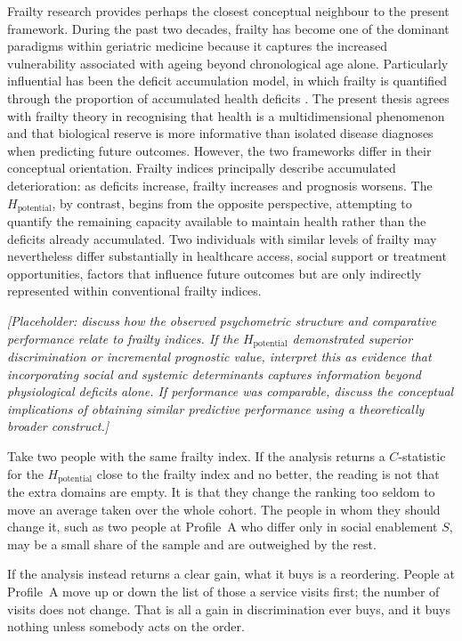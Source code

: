 Frailty research provides perhaps the closest conceptual neighbour to the present framework. During the past two decades, frailty has become one of the dominant paradigms within geriatric medicine because it captures the increased vulnerability associated with ageing beyond chronological age alone. Particularly influential has been the deficit accumulation model, in which frailty is quantified through the proportion of accumulated health deficits \citep{rockwood_mitnitski_2007,searle_2008}. The present thesis agrees with frailty theory in recognising that health is a multidimensional phenomenon and that biological reserve is more informative than isolated disease diagnoses when predicting future outcomes. However, the two frameworks differ in their conceptual orientation. Frailty indices principally describe accumulated deterioration: as deficits increase, frailty increases and prognosis worsens. The $H_{\text{potential}}$, by contrast, begins from the opposite perspective, attempting to quantify the remaining capacity available to maintain health rather than the deficits already accumulated. Two individuals with similar levels of frailty may nevertheless differ substantially in healthcare access, social support or treatment opportunities, factors that influence future outcomes but are only indirectly represented within conventional frailty indices.

\medskip
\noindent\emph{[Placeholder: discuss how the observed psychometric structure and comparative performance relate to frailty indices. If the $H_{\text{potential}}$ demonstrated superior discrimination or incremental prognostic value, interpret this as evidence that incorporating social and systemic determinants captures information beyond physiological deficits alone. If performance was comparable, discuss the conceptual implications of obtaining similar predictive performance using a theoretically broader construct.]}

\begin{reading}
Take two people with the same frailty index. If the analysis returns a
$C$-statistic for the $H_{\text{potential}}$ close to the frailty index and no
better, the reading is not that the extra domains are empty. It is that they
change the ranking too seldom to move an average taken over the whole cohort.
The people in whom they should change it, such as two people at Profile~A who
differ only in social enablement $S$, may be a small share of the sample and are
outweighed by the rest.

If the analysis instead returns a clear gain, what it buys is a reordering.
People at Profile~A move up or down the list of those a service visits first; the number of visits
does not change. That is all a gain in discrimination ever buys, and it buys
nothing unless somebody acts on the order.
\end{reading}

